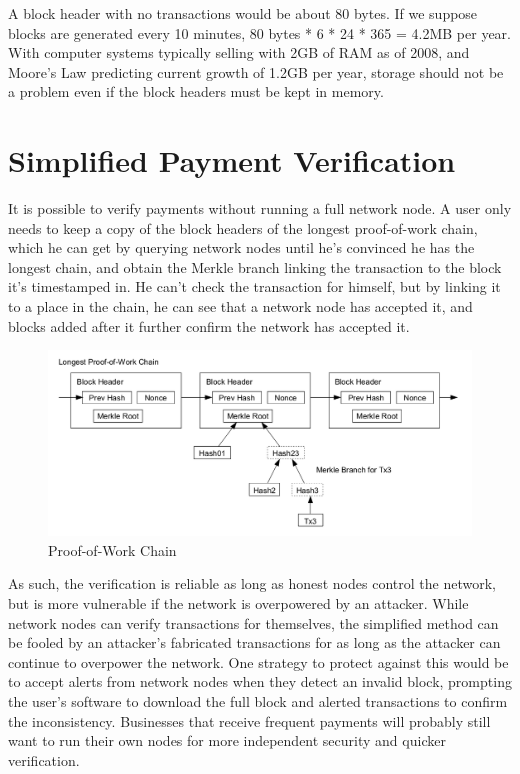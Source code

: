 A block header with no transactions would be about 80 bytes. If we suppose blocks are generated every 10 minutes, 80 bytes * 6 * 24 * 365 = 4.2MB per year. With computer systems typically selling with 2GB of RAM as of 2008, and Moore's Law predicting current growth of 1.2GB per year, storage should not be a problem even if the block headers must be kept in memory.

\section{Simplified Payment Verification}

It is possible to verify payments without running a full network node. A user only needs to keep a copy of the block headers of the longest proof-of-work chain, which he can get by querying network nodes until he's convinced he has the longest chain, and obtain the Merkle branch linking the transaction to the block it's timestamped in. He can't check the transaction for himself, but by linking it to a place in the chain, he can see that a network node has accepted it, and blocks added after it further confirm the network has accepted it.

\begin{figure}[ht!]
\centering
\includegraphics[trim = 0mm 0mm 0mm 0mm, width=120mm]{proof_of_work}
\caption{Proof-of-Work Chain}
\end{figure}

As such, the verification is reliable as long as honest nodes control the network, but is more vulnerable if the network is overpowered by an attacker. While network nodes can verify transactions for themselves, the simplified method can be fooled by an attacker's fabricated transactions for as long as the attacker can continue to overpower the network. One strategy to protect against this would be to accept alerts from network nodes when they detect an invalid block, prompting the user's software to download the full block and alerted transactions to confirm the inconsistency. Businesses that receive frequent payments will probably still want to run their own nodes for more independent security and quicker verification.

